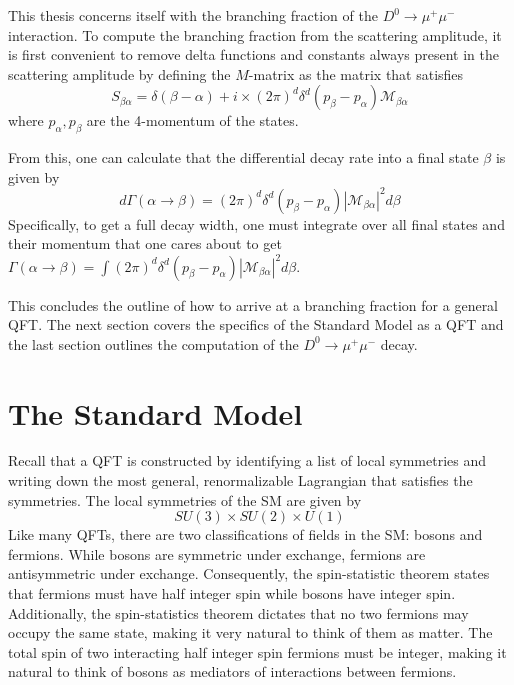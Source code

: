 This thesis concerns itself with the branching fraction of the $D^0 \to \mu^+ \mu^-$ interaction. To compute the branching fraction from the scattering amplitude, it is first convenient to remove delta functions and constants always present in the scattering amplitude by defining the $M$-matrix as the matrix that satisfies
\begin{equation}
S_{\beta \alpha} = \delta(\beta -\alpha) + i \times(2\pi)^d \delta^d(p_{\beta}-p_{\alpha}) \mathcal{M}_{\beta \alpha}
\end{equation}
where $p_{\alpha}, p_{\beta}$ are the 4-momentum of the states. 

From this, one can calculate that the differential decay rate into a final state $\beta$ is given by
\begin{equation}
d \Gamma(\alpha \to \beta) = (2\pi)^d \delta^d(p_{\beta}-p_{\alpha}) |\mathcal{M}_{\beta \alpha}|^2 d \beta
\end{equation}
Specifically, to get a full decay width, one must integrate over all final states and their momentum that one cares about to get $\Gamma(\alpha \to \beta) = \int (2\pi)^d \delta^d(p_{\beta}-p_{\alpha}) |\mathcal{M}_{\beta \alpha}|^2 d \beta$. 

This concludes the outline of how to arrive at a branching fraction for a general QFT. The next section covers the specifics of the Standard Model as a QFT and the last section outlines the computation of the $D^0 \to \mu^+ \mu^-$ decay. 

\section{The Standard Model}

Recall that a QFT is constructed by identifying a list of local symmetries and writing down the most general, renormalizable Lagrangian that satisfies the symmetries. The local symmetries of the SM are given by
\begin{equation}
SU(3) \times SU(2) \times U(1)
\end{equation}
Like many QFTs, there are two classifications of fields in the SM: bosons and fermions. While bosons are symmetric under exchange, fermions are antisymmetric under exchange. Consequently, the spin-statistic theorem states that fermions must have half integer spin while bosons have integer spin. Additionally, the spin-statistics theorem dictates that no two fermions may occupy the same state, making it very natural to think of them as matter. The total spin of two interacting half integer spin fermions must be integer, making it natural to think of bosons as mediators of interactions between fermions. 

